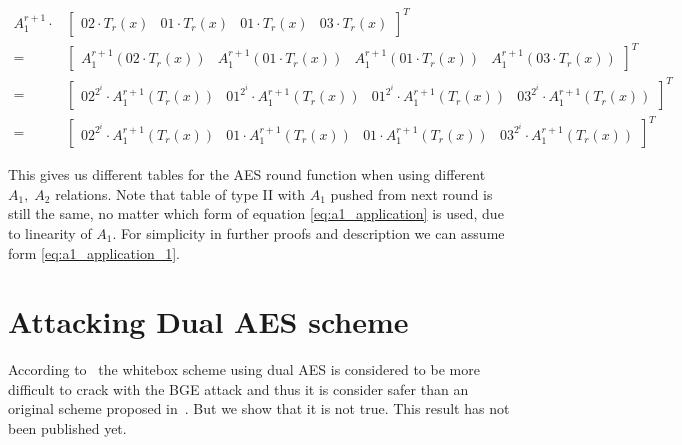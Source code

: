 \documentclass[11pt,oneside,final]{fithesis2}
\begin{document}
	{%
	\begin{subequations}\label{eq:a1_application}
	\begin{align}
	       A_1^{r+1} \cdot &\begin{bmatrix}           02 \cdot T_r(x)        &           01 \cdot T_r(x)        &           01 \cdot T_r(x)        &           03 \cdot T_r(x)        \end{bmatrix}^T \label{eq:a1_application_1} \\
	    =                  &\begin{bmatrix} A_1^{r+1}(02 \cdot T_r(x))       & A_1^{r+1}(01 \cdot T_r(x))       & A_1^{r+1}(01 \cdot T_r(x))       & A_1^{r+1}(03 \cdot T_r(x))       \end{bmatrix}^T \nonumber\\
	    =                  &\begin{bmatrix} 02^{2^i} \cdot A_1^{r+1}(T_r(x)) & 01^{2^i} \cdot A_1^{r+1}(T_r(x)) & 01^{2^i} \cdot A_1^{r+1}(T_r(x)) & 03^{2^i} \cdot A_1^{r+1}(T_r(x)) \end{bmatrix}^T \nonumber\\
	    =                  &\begin{bmatrix} 02^{2^i} \cdot A_1^{r+1}(T_r(x)) & 01 \cdot A_1^{r+1}(T_r(x))       & 01 \cdot A_1^{r+1}(T_r(x))       & 03^{2^i} \cdot A_1^{r+1}(T_r(x)) \end{bmatrix}^T
	\end{align}
	\end{subequations}}
	
	This gives us different tables for the AES round function when using different $A_1,\;A_2$ relations. Note that table of type II with $A_1$ pushed from next round 
	is still the same, no matter which form of equation \ref{eq:a1_application} is used, due to linearity of $A_1$. 
	For simplicity in further proofs and description we can assume form \ref{eq:a1_application_1}.

    \section{Attacking Dual AES scheme}\label{sec:attacking_dual_aes}
	According to~\citep{Karroumi:2010:PWA:2041036.2041060} the whitebox scheme using dual AES is considered to be more difficult to crack with the BGE attack and thus it is consider
	safer than an original scheme proposed in~\citep{Chow02white-boxcryptography}. But we show that it is not true. This result has not been published yet.
	
\end{document}
